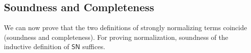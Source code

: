 \documentclass{article}
\newcommand{\SN}{\mathsf{SN}}
\newcommand{\SNe}{\mathsf{SNe}}
\newcommand{\csn}{\mathsf{sn}}
\newcommand{\red}{\longrightarrow}
\newcommand{\redSN}{\longrightarrow_\SN}
\begin{document}
\subsection{Soundness and Completeness}
We can now prove that the two definitions of strongly normalizing terms coincide (soundness and completeness).
For proving normalization, soundness of the inductive definition of $\SN$ suffices.





\end{document}
